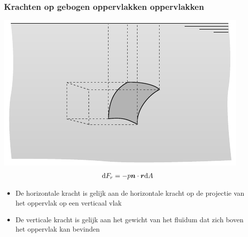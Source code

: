 \documentclass[t]{beamer}
\begin{document}
  		\begin{frame}
			\frametitle{Krachten op gebogen oppervlakken oppervlakken}
			\center
			\includegraphics[scale=0.9]{fig/hydrostatica/kracht_gebogen_oppervlak_vereenvoudigd_3d}
			\pause
			\vspace{-0.5cm}
			\begin{equation}
				\mathrm{d} F_r = -p \boldsymbol{n} \cdot \boldsymbol{r} \mathrm{d} A
			\end{equation}
			\vspace{-0.7cm}
			\begin{itemize}
				\pause
				\item De horizontale kracht is gelijk aan de horizontale kracht op de projectie van het oppervlak op een verticaal vlak
				\pause
				\item De verticale kracht is gelijk aan het gewicht van het fluïdum dat zich boven het oppervlak kan bevinden
			\end{itemize}
  		\end{frame}
\end{document}
